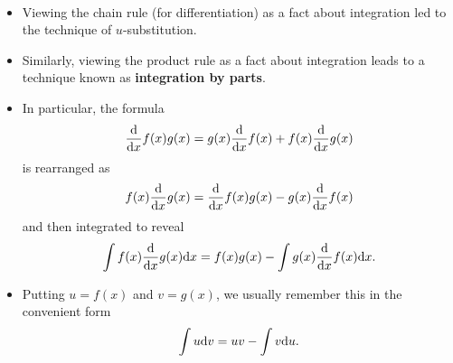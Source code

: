 %
%
%
%
%
%
%

\begin{remark}\,
\begin{itemize}
\item Viewing the chain rule (for differentiation) as a fact about integration led to the technique of $u$-substitution.
\item Similarly, viewing the product rule as a fact about integration leads to a technique known as \textbf{integration by parts}.
\item In particular, the formula
\begin{equation*}
\frac{\mathrm{d} }{\mathrm{d} x}f(x)g(x) = g(x)\frac{\mathrm{d}}{\mathrm{d} x}f(x) + f(x)\frac{\mathrm{d}}{\mathrm{d} x}g(x)
\end{equation*}
is rearranged as
\begin{equation*}
f(x)\frac{\mathrm{d}}{\mathrm{d} x}g(x) = \frac{\mathrm{d} }{\mathrm{d} x}f(x)g(x) - g(x)\frac{\mathrm{d}}{\mathrm{d} x}f(x) 
\end{equation*}
and then integrated to reveal
\begin{equation*}
\int f(x)\frac{\mathrm{d}}{\mathrm{d} x}g(x)\mathrm{d} x = f(x)g(x) - \int g(x)\frac{\mathrm{d}}{\mathrm{d} x}f(x) \mathrm{d} x.
\end{equation*}
\item Putting $u=f(x)$ and $v=g(x)$, we usually remember this in the convenient form
\begin{equation}
\int u\mathrm{d} v = uv - \int v\mathrm{d} u.
\end{equation}
\end{itemize}
\end{remark}

